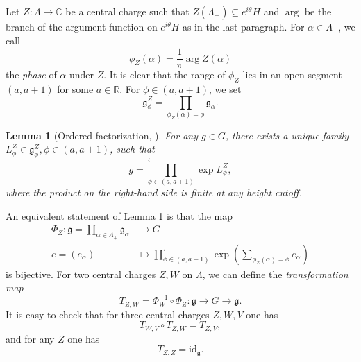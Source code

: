 \documentclass[a4paper,12pt]{amsart}
\numberwithin{equation}{section}
\newtheorem{lemma}[theorem]{Lemma}
\newcommand{\id}{\mathrm{id}}
\newcommand{\1}{\mathbf{1}}
\begin{document}
Let $Z:\Lambda\rightarrow\mathbb{C}$ be a central charge such that $Z(\Lambda_+)\subseteq e^{i\theta}H$ and $\arg$ be the branch of the argument function on $e^{i\theta}H$ as in the last paragraph. For $\alpha\in\Lambda_+$, we call
\[\phi_Z(\alpha)=\dfrac{1}{\pi}\arg Z(\alpha)\]
the \emph{phase} of $\alpha$ under $Z$. It is clear that the range of $\phi_Z$ lies in an open segment $(a,a+1)$ for some $a\in\mathbb{R}$. For $\phi\in(a,a+1)$, we set
\[\mathfrak{g}_\phi^Z=\prod_{\phi_Z(\alpha)=\phi}\mathfrak{g}_\alpha.\]
\begin{lemma}[Ordered factorization, {\cite[Section 2.2, Theorem 2 and Remark 7]{KS2008}}]\label{ordered decomposition}
    For any $g\in G$, there exists a unique family $L_\phi^Z\in\mathfrak{g}_\phi^Z,\phi\in (a,a+1)$, such that
    \[g=\prod_{\phi\in(a,a+1)}^\leftarrow\exp L_\phi^Z,\]
    where the product on the right-hand side is finite at any height cutoff.
\end{lemma}
An equivalent statement of Lemma \ref{ordered decomposition} is that the map
\begin{align*}
    \Phi_Z:\mathfrak{g}=\prod_{\alpha\in\Lambda_+}\mathfrak{g}_\alpha&\rightarrow G\\
    e=(e_{\alpha})&\mapsto\prod_{\phi\in(a,a+1)}^\leftarrow\exp\left(\sum_{\phi_Z(\alpha)=\phi}e_\alpha\right)
\end{align*}
is bijective. For two central charges $Z,W$ on $\Lambda$, we can define the \emph{transformation map}
\[T_{Z,W}=\Phi_W^{-1}\circ\Phi_Z:\mathfrak{g}\rightarrow G\rightarrow\mathfrak{g}.\]
It is easy to check that for three central charges $Z,W,V$ one has
\[T_{W,V}\circ T_{Z,W}=T_{Z,V},\]
and for any $Z$ one has
\[T_{Z,Z}=\id_{\mathfrak{g}}.\]
\end{document}
